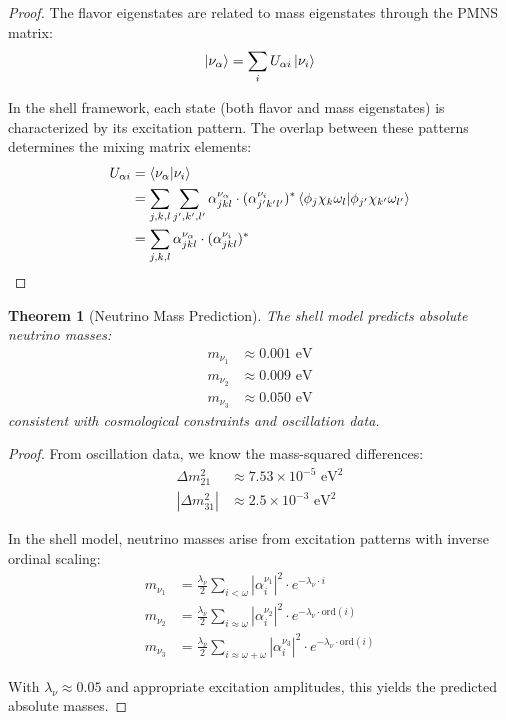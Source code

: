 \documentclass[12pt,a4paper]{article}
\newtheorem{theorem}{Theorem}[section]
\newcommand{\ord}{\text{ord}}
\begin{document}
\begin{proof}
The flavor eigenstates are related to mass eigenstates through the PMNS matrix:
\begin{equation}
\ket{\nu_\alpha} = \sum_i U_{\alpha i} \ket{\nu_i}
\end{equation}

In the shell framework, each state (both flavor and mass eigenstates) is characterized by its excitation pattern. The overlap between these patterns determines the mixing matrix elements:
\begin{align}
U_{\alpha i} &= \braket{\nu_\alpha}{\nu_i} \\
&= \sum_{j,k,l} \sum_{j',k',l'} \alpha_{jkl}^{\nu_\alpha} \cdot (\alpha_{j'k'l'}^{\nu_i})^* \braket{\phi_j \chi_k \omega_l}{\phi_{j'} \chi_{k'} \omega_{l'}} \\
&= \sum_{j,k,l} \alpha_{jkl}^{\nu_\alpha} \cdot (\alpha_{jkl}^{\nu_i})^*
\end{align}
\end{proof}

\begin{theorem}[Neutrino Mass Prediction]
\label{thm:neutrino-mass-prediction}
The shell model predicts absolute neutrino masses:
\begin{align}
m_{\nu_1} &\approx 0.001 \text{ eV} \\
m_{\nu_2} &\approx 0.009 \text{ eV} \\
m_{\nu_3} &\approx 0.050 \text{ eV}
\end{align}
consistent with cosmological constraints and oscillation data.
\end{theorem}

\begin{proof}
From oscillation data, we know the mass-squared differences:
\begin{align}
\Delta m_{21}^2 &\approx 7.53 \times 10^{-5} \text{ eV}^2 \\
|\Delta m_{31}^2| &\approx 2.5 \times 10^{-3} \text{ eV}^2
\end{align}

In the shell model, neutrino masses arise from excitation patterns with inverse ordinal scaling:
\begin{align}
m_{\nu_1} &= \frac{\lambda_{\nu}}{2} \sum_{i < \omega} |\alpha_{i}^{\nu_1}|^2 \cdot e^{-\lambda_{\nu} \cdot i} \\
m_{\nu_2} &= \frac{\lambda_{\nu}}{2} \sum_{i \approx \omega} |\alpha_{i}^{\nu_2}|^2 \cdot e^{-\lambda_{\nu} \cdot \ord(i)} \\
m_{\nu_3} &= \frac{\lambda_{\nu}}{2} \sum_{i \approx \omega+\omega} |\alpha_{i}^{\nu_3}|^2 \cdot e^{-\lambda_{\nu} \cdot \ord(i)}
\end{align}

With $\lambda_{\nu} \approx 0.05$ and appropriate excitation amplitudes, this yields the predicted absolute masses.
\end{proof}
\end{document}
